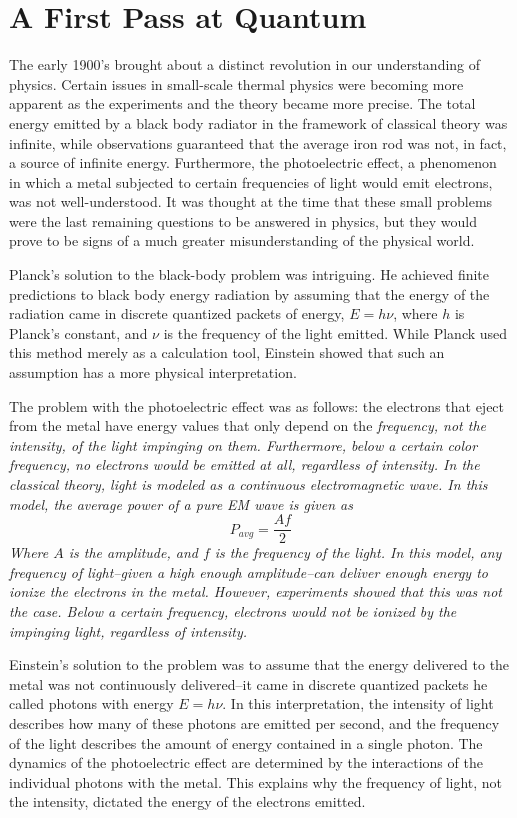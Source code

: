 \section{A First Pass at Quantum}
The early 1900's brought about a distinct revolution in our understanding of
physics. Certain issues in small-scale thermal physics were becoming more
apparent as the experiments and the theory became more precise.  The total
energy emitted by a black body radiator in the framework of classical theory was
infinite, while observations guaranteed that the average iron rod was not, in
fact, a source of infinite energy. Furthermore, the photoelectric effect, a
phenomenon in which a metal subjected to certain frequencies of light would emit
electrons, was not well-understood. It was thought at the time that these small
problems were the last remaining questions to be answered in physics, but they
would prove to be signs of a much greater misunderstanding of the physical
world.

Planck's solution to the black-body problem was intriguing. He achieved finite
predictions to black body energy radiation by assuming that the energy of the
radiation came in discrete quantized packets of energy, $E=h\nu$, where $h$ is
Planck's constant, and $\nu$ is the frequency of the light emitted. While Planck
used this method merely as a calculation tool, Einstein showed that
such an assumption has a more physical interpretation.

The problem with the photoelectric effect was as follows: the electrons that
eject from the metal have energy values that only depend on the \em
frequency\em, not the intensity, of the light impinging on them. Furthermore,
below a certain color frequency, no electrons would be emitted at all,
regardless of intensity. In the classical theory, light is modeled as a
continuous electromagnetic wave. In this model, the average power of a pure
EM wave is given as
\[
    P_{avg} = \frac{Af}{2}
\]
Where $A$ is the amplitude, and $f$ is the frequency of the light. In this
model, any frequency of light--given a high enough amplitude--can deliver enough
energy to ionize the electrons in the metal. However, experiments showed that
this was not the case. Below a certain frequency, electrons would not be ionized
by the impinging light, regardless of intensity.

Einstein's solution to the problem was to assume that the energy delivered to
the metal was not continuously delivered--it came in discrete quantized packets
he called photons with energy $E = h\nu$. In this interpretation, the intensity
of light describes how many of these photons are emitted per second, and the
frequency of the light describes the amount of energy contained in a single
photon. The dynamics of the photoelectric effect are determined by the
interactions of the individual photons with the metal. This explains why the
frequency of light, not the intensity, dictated the energy of the electrons
emitted.

